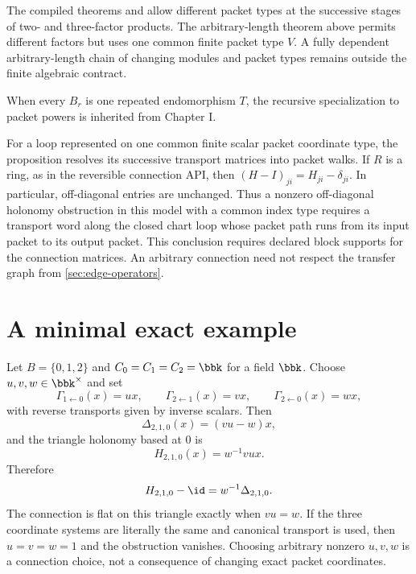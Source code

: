 \begin{boundary}
The compiled theorems
 and
 allow different packet
types at the successive stages of two- and three-factor products.  The
arbitrary-length theorem above permits different factors but uses one common
finite packet type $V$.  A fully dependent arbitrary-length chain of changing
modules and packet types remains outside the finite algebraic contract.
\end{boundary}

\begin{remark}
When every $B_r$ is one repeated endomorphism $T$, the recursive
specialization to packet powers is inherited from Chapter I.
\end{remark}

For a loop represented on one common finite scalar packet coordinate type,
the proposition resolves its successive transport matrices into packet
walks.  If $R$ is a ring, as in the reversible connection API, then
$(H-I)_{ji}=H_{ji}-\delta_{ji}$.  In particular, off-diagonal entries are
unchanged.  Thus a nonzero off-diagonal holonomy obstruction in this model
with a common index type requires a transport word along the closed chart
loop whose packet path runs from its input packet to its output packet.  This
conclusion requires declared block supports for the connection matrices.
An arbitrary connection need not respect the transfer graph from
\cref{sec:edge-operators}.

\section{A minimal exact example}
\label{sec:example}

\begin{example}
Let $B=\{0,1,2\}$ and $C_0=C_1=C_2=\bbk$ for a field $\bbk$.  Choose
$u,v,w\in\bbk^\times$ and set
\[
\Gamma_{1\leftarrow0}(x)=ux,\qquad
\Gamma_{2\leftarrow1}(x)=vx,\qquad
\Gamma_{2\leftarrow0}(x)=wx,
\]
with reverse transports given by inverse scalars.  Then
\[
\Delta_{2,1,0}(x)=(vu-w)x,
\]
and the triangle holonomy based at $0$ is
\[
H_{2,1,0}(x)=w^{-1}vux.
\]
Therefore
\[
H_{2,1,0}-\id
=w^{-1}\Delta_{2,1,0}.
\]
The connection is flat on this triangle exactly when $vu=w$.  If the three
coordinate systems are literally the same and canonical transport is used,
then $u=v=w=1$ and the obstruction vanishes.  Choosing arbitrary nonzero
$u,v,w$ is a connection choice, not a consequence of changing exact packet
coordinates.
\end{example}

